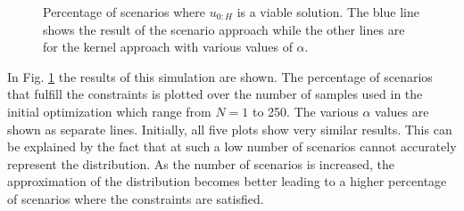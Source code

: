 \begin{figure}[t]
		\def\file{data/AlphaTest_K200_MaxConstraint_S2.txt}
		
		\centering
		\vspace*{-0.4cm}
		
		\caption{Percentage of scenarios where $u_{0:H}$ is a viable solution. The blue line shows the result of the scenario approach while the other lines are for the kernel approach with various values of $\alpha$.}
		\label{fig:robustness_plot}
\end{figure}


In Fig. \ref{fig:robustness_plot} the results of this simulation are shown. The percentage of scenarios that fulfill the constraints is plotted over the number of samples used in the initial optimization which range from $N = 1$ to 250. The various $\alpha$ values are shown as separate lines. Initially, all five plots show very similar results. This can be explained by the fact that at such a low number of scenarios cannot accurately represent the distribution. As the number of scenarios is increased, the approximation of the distribution becomes better leading to a higher percentage of scenarios where the constraints are satisfied.

